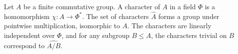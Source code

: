 Let $A$ be a finite commutative group. A character of $A$ in a field $\Phi$ is a homomorphism $\chi: A \to \Phi^*$. The set of characters $\hat{A}$ forms a group under pointwise multiplication, isomorphic to $A$. The characters are linearly independent over $\Phi$, and for any subgroup $B \leq A$, the characters trivial on $B$ correspond to $\widehat{A/B}$.
